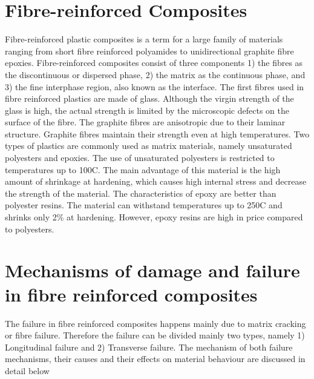 \documentclass[12pt]{report}
\begin{document}
\section{Fibre-reinforced Composites}
\indent\indent\indent  Fibre-reinforced plastic composites is a term for a large family of materials ranging from short fibre reinforced polyamides to unidirectional graphite fibre epoxies. Fibre-reinforced composites consist of three components 1) the fibres as the discontinuous or dispersed phase, 2) the matrix as the continuous phase, and 3) the fine interphase region, also known as the interface.  The first fibres used in fibre reinforced plastics are made of glass. Although the virgin strength of the glass is high, the actual strength is limited by the microscopic defects on the surface of the fibre. The graphite fibres are anisotropic due to their laminar structure. Graphite fibres maintain their strength even at high temperatures. Two types of plastics are commonly used as matrix materials, namely unsaturated polyesters and epoxies. The use of unsaturated polyesters is restricted to temperatures up to 100C. The main advantage of this material is the high amount of shrinkage at hardening, which causes high internal stress and decrease the strength of the material.  The characteristics of epoxy are better than polyester resins. The material can withstand temperatures up to 250C and shrinks only  2\%  at hardening. However, epoxy resins are high in price compared to polyesters.


\section{Mechanisms of damage and failure in fibre reinforced composites}
\indent\indent\indent The failure in fibre reinforced composites happens mainly due to matrix cracking or fibre failure. Therefore the failure can be divided mainly two types, namely 1) Longitudinal failure and 2) Transverse failure. The mechanism of both failure mechanisms, their causes and their effects on material behaviour are discussed in detail below
\end{document}
